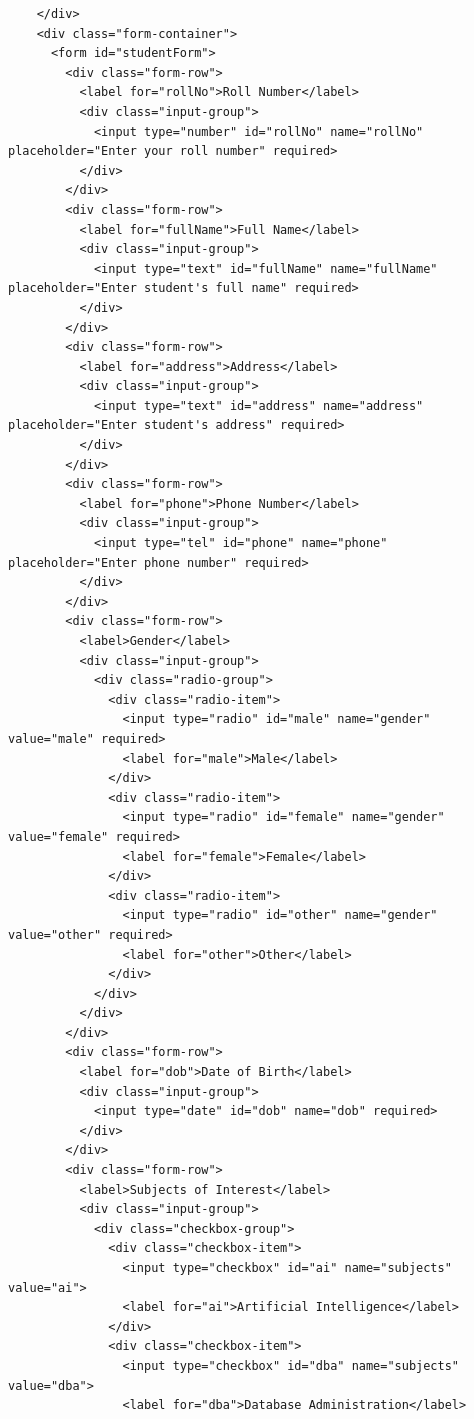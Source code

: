\documentclass[a4paper,12pt]{article}
\begin{document}
\begin{lstlisting}
    </div>
    <div class="form-container">
      <form id="studentForm">
        <div class="form-row">
          <label for="rollNo">Roll Number</label>
          <div class="input-group">
            <input type="number" id="rollNo" name="rollNo" placeholder="Enter your roll number" required>
          </div>
        </div>
        <div class="form-row">
          <label for="fullName">Full Name</label>
          <div class="input-group">
            <input type="text" id="fullName" name="fullName" placeholder="Enter student's full name" required>
          </div>
        </div>
        <div class="form-row">
          <label for="address">Address</label>
          <div class="input-group">
            <input type="text" id="address" name="address" placeholder="Enter student's address" required>
          </div>
        </div>
        <div class="form-row">
          <label for="phone">Phone Number</label>
          <div class="input-group">
            <input type="tel" id="phone" name="phone" placeholder="Enter phone number" required>
          </div>
        </div>
        <div class="form-row">
          <label>Gender</label>
          <div class="input-group">
            <div class="radio-group">
              <div class="radio-item">
                <input type="radio" id="male" name="gender" value="male" required>
                <label for="male">Male</label>
              </div>
              <div class="radio-item">
                <input type="radio" id="female" name="gender" value="female" required>
                <label for="female">Female</label>
              </div>
              <div class="radio-item">
                <input type="radio" id="other" name="gender" value="other" required>
                <label for="other">Other</label>
              </div>
            </div>
          </div>
        </div>
        <div class="form-row">
          <label for="dob">Date of Birth</label>
          <div class="input-group">
            <input type="date" id="dob" name="dob" required>
          </div>
        </div>
        <div class="form-row">
          <label>Subjects of Interest</label>
          <div class="input-group">
            <div class="checkbox-group">
              <div class="checkbox-item">
                <input type="checkbox" id="ai" name="subjects" value="ai">
                <label for="ai">Artificial Intelligence</label>
              </div>
              <div class="checkbox-item">
                <input type="checkbox" id="dba" name="subjects" value="dba">
                <label for="dba">Database Administration</label>

\end{lstlisting}
\end{document}
